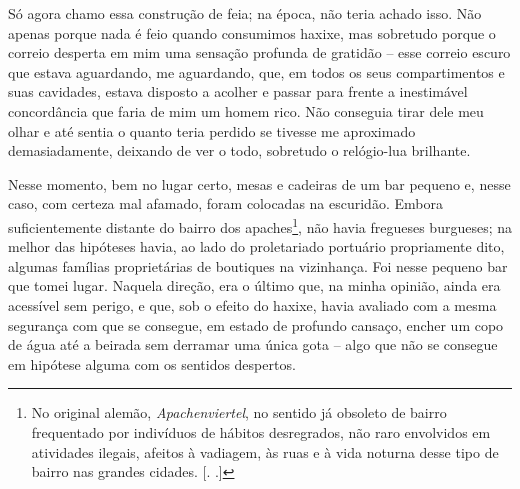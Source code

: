 Só agora chamo essa construção de feia; na época, não teria achado isso.
Não apenas porque nada é feio quando consumimos haxixe, mas sobretudo
porque o correio desperta em mim uma sensação profunda de gratidão --
esse correio escuro que estava aguardando, me aguardando, que, em todos
os seus compartimentos e suas cavidades, estava disposto a acolher e
passar para frente a inestimável concordância que faria de mim um homem
rico. Não conseguia tirar dele meu olhar e até sentia o quanto teria
perdido se tivesse me aproximado demasiadamente, deixando de ver o todo,
sobretudo o relógio-lua brilhante.

Nesse momento, bem no lugar certo, mesas e cadeiras de um bar pequeno e,
nesse caso, com certeza mal afamado, foram colocadas na escuridão.
Embora suficientemente distante do bairro dos apaches\footnote{No
  original alemão, \emph{Apachenviertel}, no sentido já obsoleto de
  bairro frequentado por indivíduos de hábitos desregrados,
  não raro envolvidos em atividades ilegais, afeitos à vadiagem, às ruas
  e à vida noturna desse tipo de bairro nas grandes cidades. [. .]}, não havia
fregueses burgueses; na melhor das hipóteses havia, ao lado do
proletariado portuário propriamente dito, algumas famílias proprietárias
de boutiques na vizinhança. Foi nesse pequeno bar que tomei lugar.
Naquela direção, era o último que, na minha opinião, ainda era acessível
sem perigo, e que, sob o efeito do haxixe, havia avaliado com a mesma
segurança com que se consegue, em estado de profundo cansaço, encher um
copo de água até a beirada sem derramar uma única gota -- algo que não
se consegue em hipótese alguma com os sentidos despertos.

